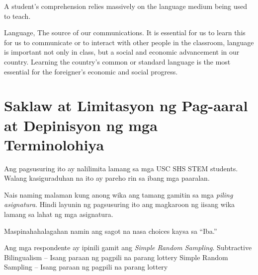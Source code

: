 \documentclass [parskip=full, 11pt] {scrreprt}
\begin{document}
A student's comprehension relies massively on the language medium being used to
teach. 

Language, The source of our communications. It is essential for us to learn this
for us to communicate or to interact with other people in the classroom,
language is important not only in class, but a social and economic advancement
in our country. Learning the country's common or standard language is  the most
essential for the foreigner's economic and social progress. 

\pagebreak
\section {Saklaw at Limitasyon ng Pag-aaral at Depinisyon ng mga Terminolohiya}
Ang pagsusuring ito ay nalilimita lamang sa mga USC SHS STEM students. Walang
kasiguraduhan na ito ay pareho rin sa ibang mga paaralan.

Nais naming malaman kung anong wika ang tamang gamitin sa mga \emph{piling
  asignatura}. Hindi layunin ng pagsusuring ito ang magkaroon ng iisang wika
lamang sa lahat ng mga asignatura.

Maspinahahalagahan namin ang sagot na nasa choices kaysa sa ``Iba.''

Ang mga respondente ay ipinili gamit ang \emph{Simple Random Sampling}.
\vfill
Subtractive Bilingualism -- Isang paraan ng pagpili na parang lottery
Simple Random Sampling -- Isang paraan ng pagpili na parang lottery
\pagebreak
\end{document}
